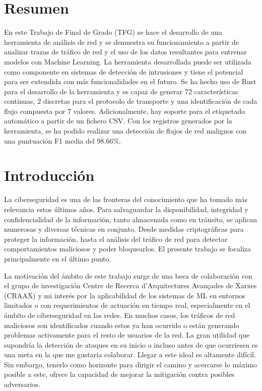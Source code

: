 \documentclass[10pt,a4paper,twoside]{article}
\begin{document}
\begin{multicols}{2}
    \section*{Resumen}

    En este Trabajo de Final de Grado (TFG) se hace el desarrollo de una herramienta de análisis de red y se demuestra su funcionamiento a partir de analizar trazas de tráfico de red y el uso de los datos resultantes para entrenar modelos con Machine Learning. La herramienta desarrollada puede ser utilizada como componente en sistemas  de detección de intrusiones y tiene el potencial para ser extendida con más funcionalidades en el futuro. Se ha hecho uso de Rust para el desarrollo de la herramienta y es capaz de generar 72 características continuas, 2 discretas para el protocolo de transporte y una identificación de cada flujo compuesta por 7 valores. Adicionalmente, hay soporte para el etiquetado automático a partir de un fichero CSV. Con los registros generados por la herramienta, se ha podido realizar una detección de flujos de red malignos con una puntuación F1 media del 98.66\%.

    \section{Introducción}


    La ciberseguridad es una de las fronteras del conocimiento que ha tomado más relevancia estos últimos años. Para salvaguardar la disponibilidad, integridad y confidencialidad de la información, tanto almacenada como en tránsito, se aplican numerosas y diversas técnicas en conjunto. Desde medidas criptográficas para proteger la información, hasta el análisis del tráfico de red para detectar comportamientos maliciosos y poder bloquearlos. El presente trabajo se focaliza principalmente en el último punto.


    La motivación del ámbito de este trabajo surge de una beca de colaboración con el grupo de investigación Centre de Recerca d'Arquitectures Avançades de Xarxes (CRAAX) y mi interés por la aplicabilidad de los sistemas de ML en entornos limitados o con requerimientos de actuación en tiempo real, especialmente en el ámbito de ciberseguridad en las redes. En muchos casos, los tráficos de red maliciosos son identificados cuando estos ya han ocurrido o están generando problemas activamente para el resto de usuarios de la red. La gran utilidad que supondría la detección de ataques en su inicio o incluso antes de que ocurriesen es una meta en la que me gustaría colaborar. Llegar a este ideal es altamente difícil. Sin embargo, tenerlo como horizonte para dirigir el camino y acercarse lo máximo posible a este, ofrece la capacidad de mejorar la mitigación contra posibles adversarios.


\end{multicols}
\end{document}
